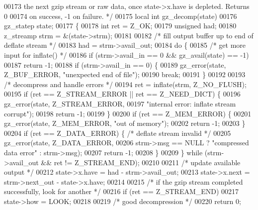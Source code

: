\begin{DoxyCode}
00173 \textcolor{comment}{   the next gzip stream or raw data, once state->x.have is depleted.  Returns 0}
00174 \textcolor{comment}{   on success, -1 on failure. */}
00175 local \textcolor{keywordtype}{int} gz\_decomp(state)
00176     gz\_statep state;
00177 \{
00178     \textcolor{keywordtype}{int} ret = Z\_OK;
00179     \textcolor{keywordtype}{unsigned} had;
00180     z\_streamp strm = &(state->strm);
00181 
00182     \textcolor{comment}{/* fill output buffer up to end of deflate stream */}
00183     had = strm->avail\_out;
00184     \textcolor{keywordflow}{do} \{
00185         \textcolor{comment}{/* get more input for inflate() */}
00186         \textcolor{keywordflow}{if} (strm->avail\_in == 0 && gz\_avail(state) == -1)
00187             \textcolor{keywordflow}{return} -1;
00188         \textcolor{keywordflow}{if} (strm->avail\_in == 0) \{
00189             gz\_error(state, Z\_BUF\_ERROR, \textcolor{stringliteral}{"unexpected end of file"});
00190             \textcolor{keywordflow}{break};
00191         \}
00192 
00193         \textcolor{comment}{/* decompress and handle errors */}
00194         ret = inflate(strm, Z\_NO\_FLUSH);
00195         \textcolor{keywordflow}{if} (ret == Z\_STREAM\_ERROR || ret == Z\_NEED\_DICT) \{
00196             gz\_error(state, Z\_STREAM\_ERROR,
00197                      \textcolor{stringliteral}{"internal error: inflate stream corrupt"});
00198             \textcolor{keywordflow}{return} -1;
00199         \}
00200         \textcolor{keywordflow}{if} (ret == Z\_MEM\_ERROR) \{
00201             gz\_error(state, Z\_MEM\_ERROR, \textcolor{stringliteral}{"out of memory"});
00202             \textcolor{keywordflow}{return} -1;
00203         \}
00204         \textcolor{keywordflow}{if} (ret == Z\_DATA\_ERROR) \{              \textcolor{comment}{/* deflate stream invalid */}
00205             gz\_error(state, Z\_DATA\_ERROR,
00206                      strm->msg == NULL ? \textcolor{stringliteral}{"compressed data error"} : strm->msg);
00207             \textcolor{keywordflow}{return} -1;
00208         \}
00209     \} \textcolor{keywordflow}{while} (strm->avail\_out && ret != Z\_STREAM\_END);
00210 
00211     \textcolor{comment}{/* update available output */}
00212     state->x.have = had - strm->avail\_out;
00213     state->x.next = strm->next\_out - state->x.have;
00214 
00215     \textcolor{comment}{/* if the gzip stream completed successfully, look for another */}
00216     \textcolor{keywordflow}{if} (ret == Z\_STREAM\_END)
00217         state->how = LOOK;
00218 
00219     \textcolor{comment}{/* good decompression */}
00220     \textcolor{keywordflow}{return} 0;

\end{DoxyCode}
